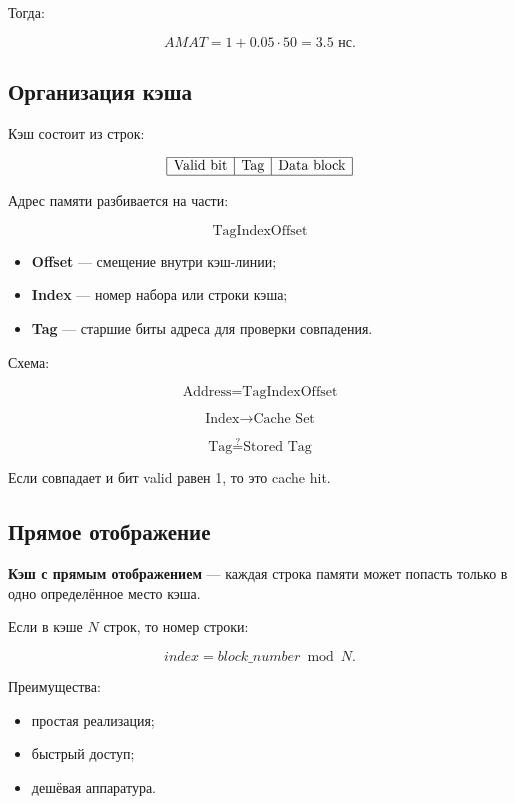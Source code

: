 \documentclass[12pt,a4paper]{article}
\theoremstyle{remark}
\begin{document}
Тогда:

\[
AMAT = 1 + 0.05 \cdot 50 = 3.5 \text{ нс}.
\]

\subsection{Организация кэша}

Кэш состоит из строк:

\[
\begin{array}{|c|c|c|}
\hline
\text{Valid bit} & \text{Tag} & \text{Data block} \\
\hline
\end{array}
\]

Адрес памяти разбивается на части:

\[
\boxed{\text{Tag}}
\boxed{\text{Index}}
\boxed{\text{Offset}}
\]

\begin{itemize}
    \item \textbf{Offset} --- смещение внутри кэш-линии;
    \item \textbf{Index} --- номер набора или строки кэша;
    \item \textbf{Tag} --- старшие биты адреса для проверки совпадения.
\end{itemize}

Схема:

\[
\boxed{\text{Address}}
=
\boxed{\text{Tag}}
\boxed{\text{Index}}
\boxed{\text{Offset}}
\]

\[
\boxed{\text{Index}}
\rightarrow
\boxed{\text{Cache Set}}
\]

\[
\boxed{\text{Tag}}
\stackrel{?}{=}
\boxed{\text{Stored Tag}}
\]

Если совпадает и бит valid равен 1, то это cache hit.

\subsection{Прямое отображение}

\textbf{Кэш с прямым отображением} --- каждая строка памяти может попасть только в одно определённое место кэша.

Если в кэше $N$ строк, то номер строки:

\[
index = block\_number \bmod N.
\]

Преимущества:
\begin{itemize}
    \item простая реализация;
    \item быстрый доступ;
    \item дешёвая аппаратура.
\end{itemize}
\end{document}
